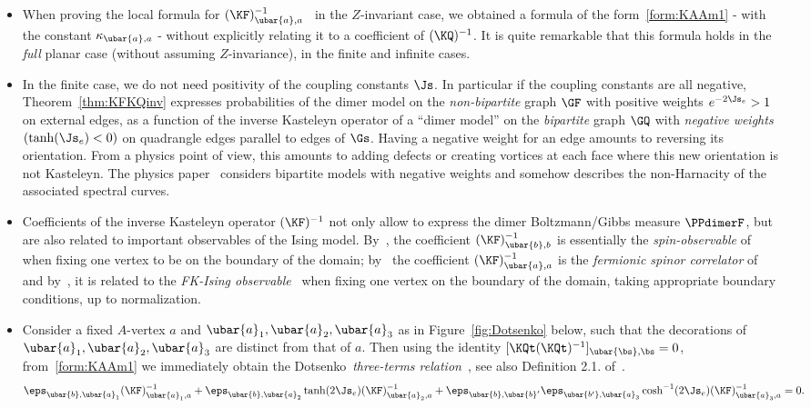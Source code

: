 \documentclass[a4paper,twoside,11pt]{article}
\begin{document}
\begin{rem}\label{rem:positivity_dimer}$\,$
\begin{itemize}
\item When proving the local formula for $(\KF)^{-1}_{\ubar{a},a}$~\cite{BoutillierdeTiliere:iso_gen,BdtR2} in the $Z$-invariant case,
we obtained a formula of the form~\eqref{form:KAAm1} - with the constant $\kappa_{\ubar{a},a}$ - without explicitly relating it to a coefficient of $(\KQ)^{-1}$. It is quite 
remarkable that this formula holds in the \emph{full} planar case (without assuming $Z$-invariance), in the finite and infinite cases.
\item In the finite case, we do not need positivity of the coupling constants $\Js$.
In particular if the coupling constants are all negative, Theorem~\ref{thm:KFKQinv} expresses probabilities of the dimer model on the 
\emph{non-bipartite} graph $\GF$ with positive weights 
$e^{-2\Js_e}>1$ on external edges, as a function of the inverse Kasteleyn operator of a ``dimer model'' on the \emph{bipartite} graph $\GQ$ with 
\emph{negative weights} $(\tanh(\Js_e)<0)$ on quadrangle edges parallel to edges of $\Gs$. Having a negative weight for an edge amounts to reversing 
its orientation. From a physics point of view, this amounts to adding defects or creating vortices
at each face where this new orientation is 
not Kasteleyn. The physics paper~\cite{Nash_Oconnor} considers bipartite models with negative weights and somehow describes the non-Harnacity of the 
associated spectral curves. 
\item Coefficients of the inverse Kasteleyn operator $(\KF)^{-1}$ not only allow to express the dimer Boltzmann/Gibbs measure $\PPdimerF$,
but are also related to important observables of the Ising model.
By~\cite{CCK}, the coefficient $(\KF)^{-1}_{\ubar{b},b}$ is essentially 
the \emph{spin-observable} of~\cite{ChelkakSmirnov:ising} when fixing one vertex to be on the boundary of the domain; 
by~\cite{Dubedat} the coefficient $(\KF)^{-1}_{\ubar{a},a}$ is the 
\emph{fermionic spinor correlator} of~\cite{KadanoffCeva} and by~\cite{NK}, it is related to the 
\emph{FK-Ising observable}~\cite{Smirnov3,Smirnov2,ChelkakSmirnov:ising} when fixing one vertex on the boundary of the domain,
taking appropriate boundary conditions, up to normalization.
\item Consider a fixed $A$-vertex $a$ and $\ubar{a}_1,\ubar{a}_2,\ubar{a}_3$ as in Figure~\ref{fig:Dotsenko} below, such that 
the decorations of 
$\ubar{a}_1,\ubar{a}_2,\ubar{a}_3$ are distinct from that of $a$. Then using the identity $[\KQt (\KQt)^{-1}]_{\ubar{\bs},\bs}=0$,
from~\eqref{form:KAAm1} we immediately obtain the Dotsenko~\emph{three-terms relation}~\cite{Dotsenko,Mercat:ising,CCK}, see also Definition 2.1. 
of~\cite{Chelkak:embedding}.
\begin{equation*}
\eps_{\ubar{b},\ubar{a}_1}(\KF)^{-1}_{\ubar{a}_1,a}+ 
\eps_{\ubar{b},\ubar{a}_2}\tanh(2\Js_e)(\KF)^{-1}_{\ubar{a}_2,a}+
\eps_{\ubar{b},\ubar{b}'}\eps_{\ubar{b'},\ubar{a}_3}\cosh^{-1}(2\Js_e)(\KF)^{-1}_{\ubar{a}_3,a}=0.
\end{equation*}


\end{itemize}
\end{rem}
\end{document}
